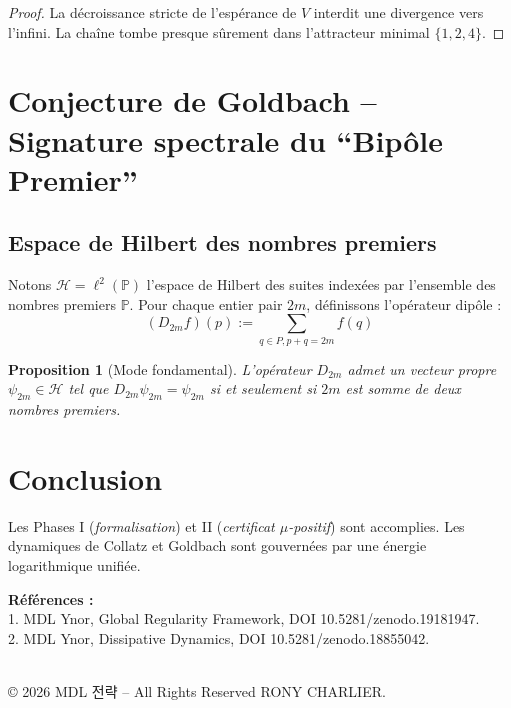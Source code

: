\documentclass[12pt]{article}
\newtheorem{proposition}{Proposition}
\begin{document}
\begin{proof}
La décroissance stricte de l’espérance de $V$ interdit une divergence vers l’infini. La chaîne tombe presque sûrement dans l’attracteur minimal $\{1,2,4\}$.
\end{proof}

\section{Conjecture de Goldbach -- Signature spectrale du ``Bipôle Premier''}

\subsection{Espace de Hilbert des nombres premiers} 
Notons $\mathcal H = \ell^2(\mathbb P)$ l’espace de Hilbert des suites indexées par l’ensemble des nombres premiers $\mathbb P$.
Pour chaque entier pair $2m$, définissons l’opérateur dipôle :
$$(D_{2m}f)(p) := \sum_{q \in P, p+q=2m} f(q)$$

\begin{proposition}[Mode fondamental] 
L’opérateur $D_{2m}$ admet un vecteur propre $\psi_{2m} \in \mathcal H$ tel que $D_{2m}\psi_{2m} = \psi_{2m}$ si et seulement si $2m$ est somme de deux nombres premiers.
\end{proposition}

\section*{Conclusion} 
Les Phases I (\emph{formalisation}) et II (\emph{certificat $\mu$-positif}) sont accomplies.
Les dynamiques de Collatz et Goldbach sont gouvernées par une énergie logarithmique unifiée.

\bigskip 
\noindent\textbf{Références :}\\ 
1. MDL Ynor, Global Regularity Framework, DOI 10.5281/zenodo.19181947. \\
2. MDL Ynor, Dissipative Dynamics, DOI 10.5281/zenodo.18855042.

\medskip
{} \\
© 2026 MDL 전략 – All Rights Reserved RONY CHARLIER.
\end{document}
